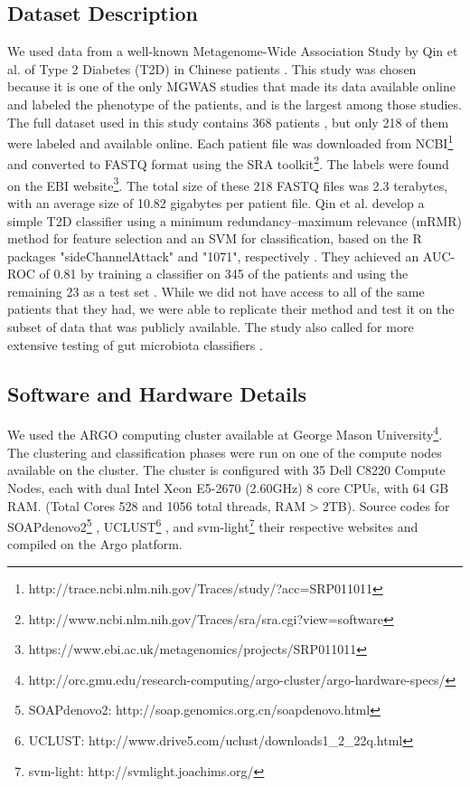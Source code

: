 \subsection{Dataset Description}

We used data from a well-known Metagenome-Wide Association Study by Qin et al. of Type 2 Diabetes (T2D) in Chinese patients \cite{qin041012}. This study was chosen because it is one of the only MGWAS studies that made its data available online and labeled the phenotype of the patients, and is the largest among those studies. The full dataset used in this study contains 368 patients \cite{qin041012}, but only 218 of them were labeled and available online. Each patient file was downloaded from NCBI\footnote{http://trace.ncbi.nlm.nih.gov/Traces/study/?acc=SRP011011}
and converted to FASTQ format using the SRA toolkit\footnote{http://www.ncbi.nlm.nih.gov/Traces/sra/sra.cgi?view=software}.
The labels were found on the EBI website\footnote{https://www.ebi.ac.uk/metagenomics/projects/SRP011011}. The total size of these 218 FASTQ files was 2.3 terabytes, with an average size of 10.82 gigabytes per patient file. Qin et al. develop a simple T2D classifier using a minimum redundancy–maximum relevance (mRMR) method \cite{peng05} for feature selection and an SVM for classification, based on the R packages "sideChannelAttack" and "1071", respectively \cite{qin041012}. They achieved an AUC-ROC of 0.81 by training a classifier on 345 of the patients and using the remaining 23 as a test set \cite{qin041012}. While we did not have access to all of the same patients that they had, we were able to replicate their method and test it on the subset of data that was publicly available. The study also called for more extensive testing of gut microbiota classifiers \cite{qin041012}.

\subsection{Software and Hardware Details}
We used the ARGO computing cluster available at George Mason University\footnote{http://orc.gmu.edu/research-computing/argo-cluster/argo-hardware-specs/}. The clustering and classification phases were run on one of the compute nodes available on the cluster. The cluster is configured with 35 Dell C8220 Compute Nodes, each with dual Intel Xeon E5-2670 (2.60GHz) 8 core CPUs, with 64 GB RAM. (Total Cores 528 and 1056 total threads, RAM$>$2TB). Source codes for 
SOAPdenovo2\footnote{SOAPdenovo2: http://soap.genomics.org.cn/soapdenovo.html} \cite{luo12}, UCLUST\footnote{UCLUST: http://www.drive5.com/uclust/downloads1\_{}2\_{}22q.html}    \cite{Edgar10}, and svm-light\footnote{svm-light: http://svmlight.joachims.org/} \cite{joachims08}
their respective websites and compiled on the Argo platform. 

